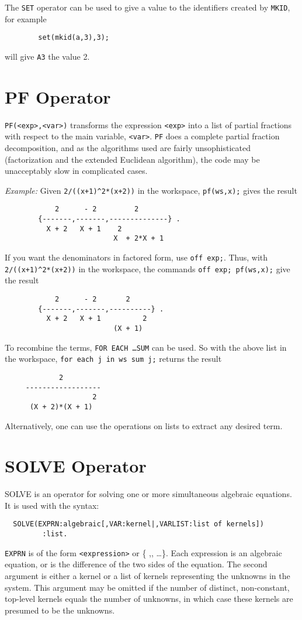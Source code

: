 The {\tt SET} operator can be used to give a value to the
identifiers created by {\tt MKID}, for example
\begin{verbatim}
        set(mkid(a,3),3);
\end{verbatim}
will give {\tt A3} the value 2.

\section{PF Operator}

{\tt PF(<exp>,<var>)} transforms the expression {\tt <exp>} into a list of
partial fractions with respect to the main variable, {\tt <var>}.  {\tt PF}
does a complete partial fraction decomposition, and as the algorithms used
are fairly unsophisticated (factorization and the extended Euclidean
algorithm), the code may be unacceptably slow in complicated cases.

{\it Example:}
Given {\tt 2/((x+1)\verb|^|2*(x+2))} in the workspace,
{\tt pf(ws,x);} gives the result
\begin{verbatim}
            2      - 2         2
        {-------,-------,--------------} .
          X + 2   X + 1    2
                          X  + 2*X + 1
\end{verbatim}

If you want the denominators in factored form, use {\tt off exp;}.
Thus, with {\tt 2/((x+1)\verb|^|2*(x+2))} in the workspace, the commands
{\tt off exp; pf(ws,x);} give the result
\begin{verbatim}
            2      - 2       2
        {-------,-------,----------} .
          X + 2   X + 1          2
                          (X + 1)
\end{verbatim}

To recombine the terms, {\tt FOR EACH \ldots SUM} can be used.  So with
the above list in the workspace, {\tt for each j in ws sum j;} returns the
result
\begin{verbatim}
             2
     ------------------
                     2
      (X + 2)*(X + 1)
\end{verbatim}

Alternatively, one can use the operations on lists to extract any desired
term.

\section{SOLVE Operator}
SOLVE is an operator for solving one or more simultaneous algebraic
equations. It is used with the syntax:
\begin{verbatim}
  SOLVE(EXPRN:algebraic[,VAR:kernel|,VARLIST:list of kernels])
         :list.
\end{verbatim}
{\tt EXPRN} is of the form {\tt <expression>} or
\{ {\tt <expression1>},{\tt <expression2>}, \dots \}.  Each expression is an
algebraic equation, or is the difference of the two sides of the equation.
The second argument is either a kernel or a list of kernels representing
the unknowns in the system.  This argument may be omitted if the number of
distinct, non-constant, top-level kernels equals the number of unknowns,
in which case these kernels are presumed to be the unknowns.

